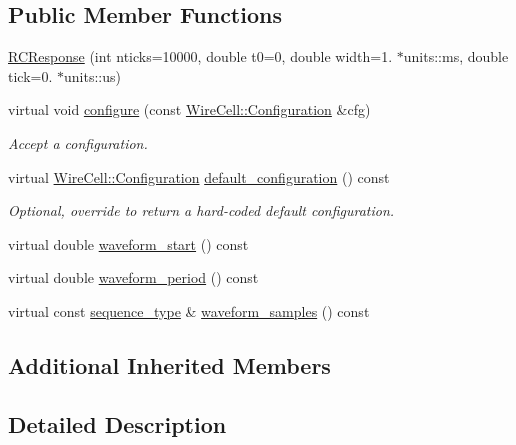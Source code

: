 \subsection*{Public Member Functions}
\begin{DoxyCompactItemize}
\item 
\hyperlink{class_wire_cell_1_1_gen_1_1_r_c_response_aa62d0e617a3d76a74251c828a2587f5d}{R\+C\+Response} (int nticks=10000, double t0=0, double width=1. $\ast$units\+::ms, double tick=0. $\ast$units\+::us)
\item 
virtual void \hyperlink{class_wire_cell_1_1_gen_1_1_r_c_response_a64fa5b6fb48fce6482836c4489bac542}{configure} (const \hyperlink{namespace_wire_cell_a9f705541fc1d46c608b3d32c182333ee}{Wire\+Cell\+::\+Configuration} \&cfg)
\begin{DoxyCompactList}\small\item\em Accept a configuration. \end{DoxyCompactList}\item 
virtual \hyperlink{namespace_wire_cell_a9f705541fc1d46c608b3d32c182333ee}{Wire\+Cell\+::\+Configuration} \hyperlink{class_wire_cell_1_1_gen_1_1_r_c_response_ae3835dd640070f3b322b546ef5c3d931}{default\+\_\+configuration} () const
\begin{DoxyCompactList}\small\item\em Optional, override to return a hard-\/coded default configuration. \end{DoxyCompactList}\item 
virtual double \hyperlink{class_wire_cell_1_1_gen_1_1_r_c_response_acbb5822df38128bb24093caf14573766}{waveform\+\_\+start} () const
\item 
virtual double \hyperlink{class_wire_cell_1_1_gen_1_1_r_c_response_a866c57fca71207b5d32b8e68b467a965}{waveform\+\_\+period} () const
\item 
virtual const \hyperlink{class_wire_cell_1_1_i_waveform_ad8f85e800ab8082ddbd89ac91164db7d}{sequence\+\_\+type} \& \hyperlink{class_wire_cell_1_1_gen_1_1_r_c_response_ac51bbb2238729a224d49dc513b02a16e}{waveform\+\_\+samples} () const
\end{DoxyCompactItemize}
\subsection*{Additional Inherited Members}


\subsection{Detailed Description}


